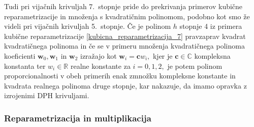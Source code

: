 \documentclass[12pt,a4paper,twoside]{article}
\theoremstyle{definition} %
\theoremstyle{plain} %
\theoremstyle{primerstyle}
\numberwithin{equation}{section}  %
\newcommand{\R}{\mathbb R}
\renewcommand{\C}{\mathbb C}
\newcommand{\cV}{\mathbf{c}}
\newcommand{\wV}{\mathbf{w}}
\begin{document}
Tudi pri vijačnih krivuljah 7.\ stopnje pride do prekrivanja primerov kubične reparametrizacije in množenja s kvadratičnim polinomom, podobno kot smo že videli pri vijačnih krivuljah 5.\ stopnje. Če je polinom $h$ stopnje 4 iz primera kubične reparametrizacije \ref{kubicna_reparametrizacija_7} pravzaprav kvadrat kvadratičnega polinoma in če se v primeru množenja kvadratičnega polinoma koeficienti $\wV_0,\wV_1$ in $\wV_2$ izražajo kot $\wV_i=\cV w_i,$ kjer je $\cV\in\C$ kompleksna konstanta ter $w_i\in\R$ realne konstante za $i=0,1,2,$ je potem polinom proporcionalnosti v obeh primerih enak zmnožku kompleksne konstante in kvadrata realnega polinoma druge stopnje, kar nakazuje, da imamo opravka z izrojenimi DPH krivuljami.

\subsubsection{Reparametrizacija in multiplikacija}
\label{reparametrizacija_multiplikacija}
\end{document}
